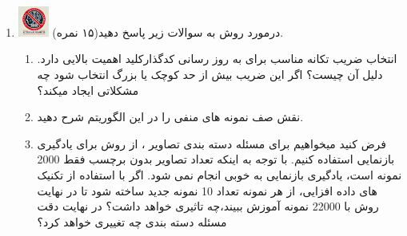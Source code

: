 \documentclass[12pt]{article}
\begin{document}
\begin{enumerate}
    \item \includegraphics[width=1cm]{figs/Forbidden_AI.jpg}
        درمورد روش  به سوالات زیر پاسخ دهید(۱۵ نمره).
        \begin{enumerate}
            \item   انتخاب ضریب تکانه مناسب برای به روز رسانی کدگذارکلید  اهمیت بالایی دارد. دلیل آن چیست؟ اگر این ضریب بیش از حد کوچک یا بزرگ انتخاب شود چه مشکلاتی ایجاد میکند؟
            \item نقش صف نمونه های منفی را در این الگوریتم شرح دهید.
            \item    فرض کنید میخواهیم برای مسئله دسته بندی تصاویر ، از روش  برای یادگیری بازنمایی استفاده کنیم.  با توجه به  اینکه تعداد تصاویر بدون  برچسب فقط 2000 نمونه است، یادگیری بازنمایی به خوبی انجام نمی شود. اگر با استفاده از تکنیک های داده افزایی، از هر نمونه تعداد 10 نمونه جدید ساخته شود تا در نهایت روش  با 22000 نمونه آموزش ببیند،چه  تاثیری خواهد  داشت؟ در نهایت دقت مسئله  دسته بندی چه تغییری خواهد کرد؟
        \end{enumerate}
      	

\end{enumerate}
\end{document}
